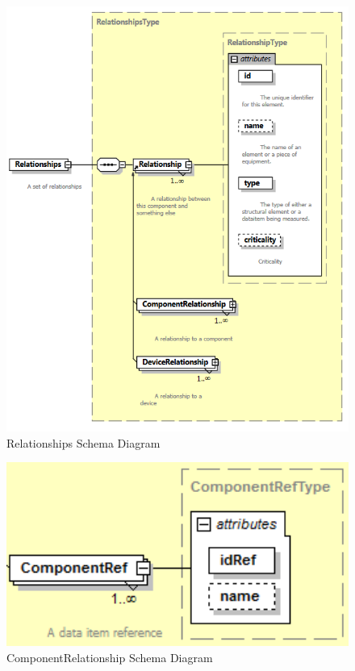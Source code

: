 \begin{figure}[ht]
  \centering
    \includegraphics[width=1.0\textwidth]{figures/Relationships Schema.png}
  \caption{Relationships Schema Diagram}
  \label{fig:Relationships Schema Diagram}
\end{figure}

\FloatBarrier


\begin{figure}[ht]
  \centering
    \includegraphics[width=1.0\textwidth]{figures/ComponentRelationship Schema.png}
  \caption{ComponentRelationship Schema Diagram}
  \label{fig:ComponentRelationship Schema Diagram}
\end{figure}

